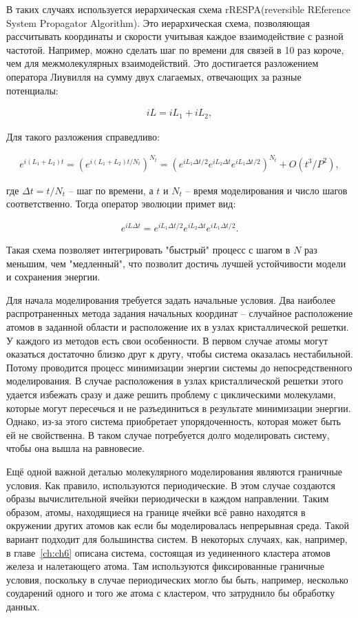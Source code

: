 В таких случаях используется иерархическая схема rRESPA(reversible REference System Propagator Algorithm)\cite{tuckerman_reversible_1992}. Это иерархическая схема, позволяющая рассчитывать координаты и скорости учитывая каждое взаимодействие с разной частотой. Например, можно сделать шаг по времени для связей в 10 раз короче, чем для межмолекулярных взаимодействий. Это достигается разложением оператора Лиувилля на сумму двух слагаемых, отвечающих за разные потенциалы:

\begin{align}
	iL = iL_1 + iL_2,
\end{align}

Для такого разложения справедливо:

\begin{align}
	e^{i(L_1+L_2)t} = (e^{i(L_1 + L_2)t/N_t})^{N_t} = (e^{i L_1 \Delta t /2} e^{i L_2 \Delta t} e^{i L_1 \Delta t /2})^{N_t} + O(t^3/P^2),
\end{align}

где $\Delta t = t/N_t$ \--- шаг по времени, а $t$ и $N_t$ \--- время моделирования и число шагов соответственно. Тогда оператор эволюции примет вид:

\begin{align}
	 e^{i L \Delta t} = e^{i L_1 \Delta t /2} e^{i L_2 \Delta t} e^{i L_1 \Delta t /2}.
\end{align}
  
Такая схема позволяет интегрировать "быстрый" процесс с шагом в $N$ раз меньшим, чем "медленный", что позволит достичь лучшей устойчивости модели и сохранения энергии.

Для начала моделирования требуется задать начальные условия. Два наиболее распротраненных метода задания начальных координат \--- случайное расположение атомов в заданной области и расположение их в узлах кристаллической решетки. У каждого из методов есть свои особенности. В первом случае атомы могут оказаться достаточно близко друг к другу, чтобы система оказалась нестабильной. Потому проводится процесс минимизации энергии системы до непосредственного моделирования. В случае расположения в узлах кристаллической решетки этого удается избежать сразу и даже решить проблему с циклическими молекулами, которые могут пересечься и не разъединиться в результате минимизации энергии. Однако, из-за этого система приобретает упорядоченность, которая может быть ей не свойственна. В таком случае потребуется долго моделировать систему, чтобы она вышла на равновесие.

Ещё одной важной деталью молекулярного моделирования являются граничные условия. Как правило, используются периодические. В этом случае создаются образы вычислительной ячейки периодически в каждом направлении. Таким образом, атомы, находящиеся на границе ячейки всё равно находятся в окружении других атомов как если бы моделировалась непрерывная среда. Такой вариант подходит для большинства систем. В некоторых случаях, как, например, в главе~\cref{ch:ch6} описана система, состоящая из уединенного кластера атомов железа и налетающего атома. Там используются фиксированные граничные условия, поскольку в случае периодических могло бы быть, например, несколько соударений одного и того же атома с кластером, что затруднило бы обработку данных.

